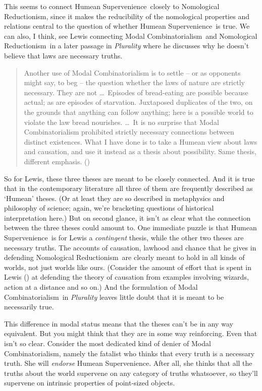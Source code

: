 \documentclass[
  11pt,
  letterpaper,
  DIV=11,
  numbers=noendperiod,
  twoside]{scrartcl}
\begin{document}
This seems to connect Humean Supervenience~closely to Nomological
Reductionism, since it makes the reducibility of the nomological
properties and relations central to the question of whether Humean
Supervenience~is true. We can also, I think, see Lewis connecting Modal
Combinatorialism~and Nomological Reductionism~in a later passage in
\emph{Plurality} where he discusses why he doesn't believe that laws are
necessary truths.

\begin{quote}
Another use of Modal Combinatorialism is to settle -- or as opponents
might say, to beg -- the question whether the laws of nature are
strictly necessary. They are not \ldots~Episodes of bread-eating are
possible because actual; as are episodes of starvation. Juxtaposed
duplicates of the two, on the grounds that anything can follow anything;
here is a possible world to violate the law bread nourishes. \ldots~It
is no surprise that Modal Combinatorialism prohibited strictly necessary
connections between distinct existences. What I have done is to take a
Humean view about laws and causation, and use it instead as a thesis
about possibility. Same thesis, different emphasis.
()
\end{quote}

So for Lewis, these three theses are meant to be closely connected. And
it is true that in the contemporary literature all three of them are
frequently described as `Humean' theses. (Or at least they are so
described in metaphysics and philosophy of science; again, we're
bracketing questions of historical interpretation here.) But on second
glance, it isn't as clear what the connection between the three theses
could amount to. One immediate puzzle is that Humean Supervenience~is
for Lewis a \emph{contingent} thesis, while the other two theses are
necessary truths. The accounts of causation, lawhood and chance that he
gives in defending Nomological Reductionism~are clearly meant to hold in
all kinds of worlds, not just worlds like ours. (Consider the amount of
effort that is spent in Lewis () at
defending the theory of causation from examples involving wizards,
action at a distance and so on.) And the formulation of Modal
Combinatorialism~in \emph{Plurality} leaves little doubt that it is
meant to be necessarily true.

This difference in modal status means that the theses can't be in any
way equivalent. But you might think that they are in some way
reinforcing. Even that isn't so clear. Consider the most dedicated kind
of denier of Modal Combinatorialism, namely the fatalist who thinks that
every truth is a necessary truth. She will \emph{endorse} Humean
Supervenience. After all, she thinks that all the truths about the world
supervene on any category of truths whatsoever, so they'll supervene on
intrinsic properties of point-sized objects.
\end{document}
